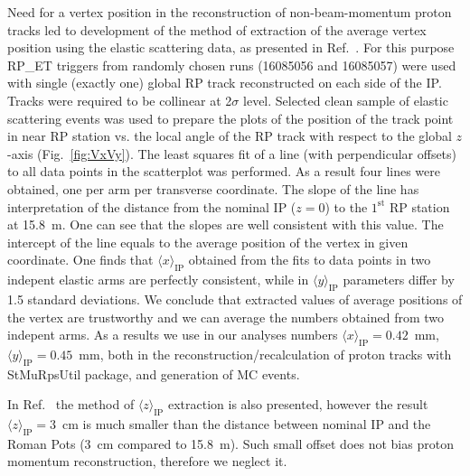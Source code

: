 Need for a vertex position in the reconstruction of non-beam-momentum proton tracks led to development of the method  of extraction of the average vertex position using the elastic scattering data, as presented in Ref.~\cite{AverageVertex}. For this purpose RP\_ET triggers from randomly chosen runs (16085056 and 16085057) were used with single (exactly one) global RP track reconstructed on each side of the IP. Tracks were required to be collinear at 2$\sigma$ level. Selected clean sample of elastic scattering events was used to prepare the plots of the position of the track point in near RP station vs. the local angle of the RP track with respect to the global $z$-axis (Fig.~\ref{fig:VxVy}). The least squares fit of a line (with perpendicular offsets) to all data points in the scatterplot was performed. As a result four lines were obtained, one per arm per transverse coordinate. The slope of the line has interpretation of the distance from the nominal IP ($z=0$) to the $1^{\text{st}}$ RP station at 15.8~m. One can see that the slopes are well consistent with this value. The intercept of the line equals to the average position of the vertex in given coordinate. One finds that $\langle x\rangle_{\text{IP}}$ obtained from the fits to data points in two indepent elastic arms are perfectly consistent, while in $\langle y\rangle_{\text{IP}}$ parameters differ by 1.5 standard deviations. We conclude that extracted values of average positions of the vertex are trustworthy and we can average the numbers obtained from two indepent arms. As a results we use in our analyses numbers $\langle x\rangle_{\text{IP}} = 0.42$~mm, $\langle y\rangle_{\text{IP}} = 0.45$~mm, both in the reconstruction/recalculation of proton tracks with StMuRpsUtil package, and generation of MC events.

In Ref.~\cite{AverageVertex} the method of $\langle z\rangle_{\text{IP}}$ extraction is also presented, however the result $\langle z\rangle_{\text{IP}}= 3$~cm is much smaller than the distance between nominal IP and the Roman Pots (3~cm compared to 15.8~m). Such small offset does not bias proton momentum reconstruction, therefore we neglect it.

